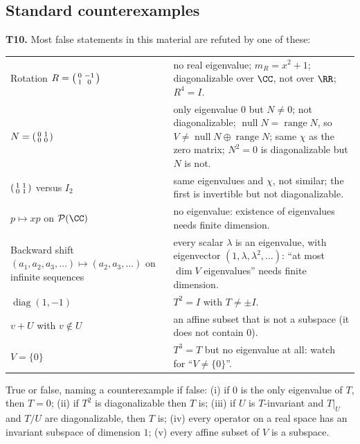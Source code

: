 \documentclass[10pt]{scrartcl}
\DeclareMathOperator{\nul}{null}
\DeclareMathOperator{\range}{range}
\newcommand{\PP}{\mathcal P}
\begin{document}
\subsection{Standard counterexamples}
\noindent\textbf{T10.} Most false statements in this material are refuted by one of these:
\begin{center}
\renewcommand{\arraystretch}{1.25}
\begin{tabular}{p{}p{}}
\hline
Rotation $R=\begin{psmallmatrix}0&-1\\1&0\end{psmallmatrix}$ & no real eigenvalue; $m_R=x^2+1$; diagonalizable over $\CC$, not over $\RR$; $R^4=I$. \\
$N=\begin{psmallmatrix}0&1\\0&0\end{psmallmatrix}$ & only eigenvalue $0$ but $N\ne0$; not diagonalizable; $\nul N=\range N$, so $V\ne\nul N\oplus\range N$; same $\chi$ as the zero matrix; $N^2=0$ is diagonalizable but $N$ is not. \\
$\begin{psmallmatrix}1&1\\0&1\end{psmallmatrix}$ versus $I_2$ & same eigenvalues and $\chi$, not similar; the first is invertible but not diagonalizable. \\
$p\mapsto xp$ on $\PP(\CC)$ & no eigenvalue: existence of eigenvalues needs finite dimension. \\
Backward shift $(a_1,a_2,a_3,\dots)\mapsto(a_2,a_3,\dots)$ on infinite sequences & every scalar $\lambda$ is an eigenvalue, with eigenvector $(1,\lambda,\lambda^2,\dots)$: ``at most $\dim V$ eigenvalues'' needs finite dimension. \\
$\operatorname{diag}(1,-1)$ & $T^2=I$ with $T\ne\pm I$. \\
$v+U$ with $v\notin U$ & an affine subset that is not a subspace (it does not contain $0$). \\
$V=\{0\}$ & $T^3=T$ but no eigenvalue at all: watch for ``$V\ne\{0\}$''. \\
\hline
\end{tabular}
\end{center}
\probs
\begin{enumerate}[(a)]
  \ii True or false, naming a counterexample if false: (i) if $0$ is the only eigenvalue of $T$, then $T=0$; (ii) if $T^2$ is diagonalizable then $T$ is; (iii) if $U$ is $T$-invariant and $T|_U$ and $T/U$ are diagonalizable, then $T$ is; (iv) every operator on a real space has an invariant subspace of dimension $1$; (v) every affine subset of $V$ is a subspace.
\end{enumerate}
\end{document}
